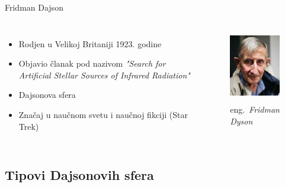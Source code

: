 \documentclass[13pt]{beamer}
\begin{document}
\begin{frame}{Fridman Dajson}


\begin{columns}
    \begin{itemize}
        \item Rodjen u Velikoj Britaniji 1923. godine
        \item Objavio članak pod nazivom \textit{"Search for Artificial Stellar Sources of Infrared Radiation"}
        \item Dajsonova sfera
        \item Značaj u naučnom svetu i naučnoj fikciji (Star Trek)
        \end{itemize}
        \begin{figure}
            \centering
            \includegraphics[width=3.5cm, height=3.2cm]{images/fridman dajson.png}
            \caption{eng.~{\em Fridman Dyson}}
        \end{figure}
\end{columns}


\end{frame}


\subsection{Tipovi Dajsonovih sfera}
\end{document}
